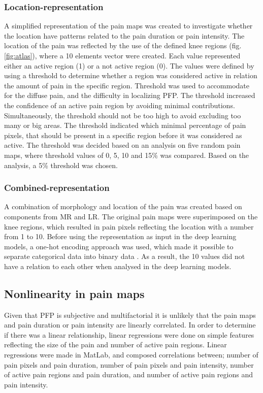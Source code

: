 \subsubsection{Location-representation}
A simplified representation of the pain maps was created to investigate whether the location have patterns related to the pain duration or pain intensity. The location of the pain was reflected by the use of the defined knee regions (fig. \ref{fig:atlas}), where a 10 elements vector were created. Each value represented either an active region (1) or a not active region (0). The values were defined by using a threshold to determine whether a region was considered active in relation the amount of pain in the specific region. Threshold was used to accommodate for the diffuse pain, and the difficulty in localizing PFP. The threshold increased the confidence of an active pain region by avoiding minimal contributions. Simultaneously, the threshold should not be too high to avoid excluding too many or big areas. The threshold indicated which minimal percentage of pain pixels, that should be present in a specific region before it was considered as active. The threshold was decided based on an analysis on five random pain maps, where threshold values of 0, 5, 10 and 15\% was compared. Based on the analysis, a 5\% threshold was chosen.  

\subsubsection{Combined-representation}
A combination of morphology and location of the pain was created based on components from MR and LR. The original pain maps were superimposed on the knee regions, which resulted in pain pixels reflecting the location with a number from 1 to 10. Before using the representation as input in the deep learning models, a one-hot encoding approach was used, which made it possible to separate categorical data into binary data \citep{Harris2012}. As a result, the 10 values did not have a relation to each other when analysed in the deep learning models. 

\subsection{Nonlinearity in pain maps} 
Given that PFP is subjective and multifactorial it is unlikely that the pain maps and pain duration or pain intensity are linearly correlated. In order to determine if there was a linear relationship, linear regressions were done on simple features reflecting the size of the pain and number of active pain regions. Linear regressions were made in MatLab, and composed correlations between; number of pain pixels and pain duration, number of pain pixels and pain intensity, number of active pain regions and pain duration, and number of active pain regions and pain intensity.

